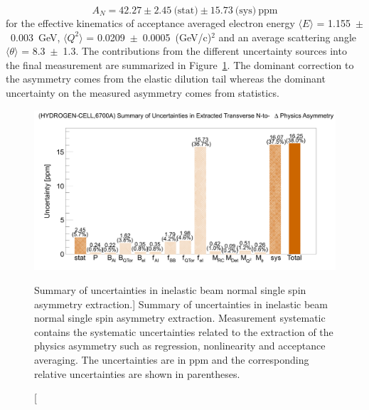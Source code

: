 \begin{equation} \label{equ:FinalResult}
A_{N} = 42.27\pm2.45~\text{(stat)}\pm15.73~\text{(sys)}~\text{ppm}
\end{equation}
for the effective kinematics of acceptance averaged electron energy $\langle E\rangle$ = 1.155~$\pm$~0.003~GeV, $\langle Q^{2}\rangle$ = 0.0209~$\pm$~0.0005~(GeV/c)$^{2}$ and an average scattering angle $\langle\theta\rangle$ = 8.3~$\pm$~1.3\degrees{}. The contributions from the different uncertainty sources into the final measurement are summarized in Figure~\ref{fig:physicsErrorChart}. The dominant correction to the asymmetry comes from the elastic dilution tail whereas the dominant uncertainty on the measured asymmetry comes from statistics.

\begin{figure}[!h]
	\begin{center}
	\includegraphics[width=15.0cm]{figures/physicsErrorChart}
	\end{center}
	\caption
	[Summary of uncertainties in inelastic beam normal single spin asymmetry extraction.]
	{Summary of uncertainties in inelastic beam normal single spin asymmetry extraction. Measurement systematic contains the systematic uncertainties related to the extraction of the physics asymmetry such as regression, nonlinearity and acceptance averaging. The uncertainties are in ppm and the corresponding relative uncertainties are shown in parentheses.}
	\label{fig:physicsErrorChart}
\end{figure}


